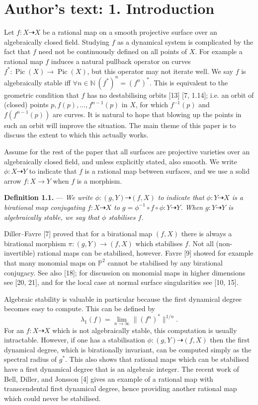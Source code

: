 \documentclass[11pt]{article}
\newcommand{\rat}{\dashrightarrow}
\newcommand{\Pic}{\operatorname{Pic}}
\newcommand{\sourcestatement}[2]{\par\medskip\noindent\textbf{#1.} --- \textit{#2}\par}
\begin{document}
\clearpage
\section*{Author's text: 1. Introduction}
Let $f:X\rat X$ be a rational map on a smooth projective surface over an
algebraically closed field. Studying $f$ as a dynamical system is complicated
by the fact that $f$ need not be continuously defined on all points of $X$.
For example a rational map $f$ induces a natural pullback operator on curves
$f^*:\Pic(X)\to\Pic(X)$, but this operator may not iterate well. We say
$f$ is algebraically stable iff $\forall n\in\mathbb N\ (f^*)^n=(f^n)^*$.
This is equivalent to the geometric condition that $f$ has no destabilising
orbits [13] [7, 1.14]; i.e. an orbit of (closed) points
$p,f(p),\ldots,f^{n-1}(p)$ in $X$, for which $f^{-1}(p)$ and
$f(f^{n-1}(p))$ are curves. It is natural to hope that blowing up the points
in such an orbit will improve the situation. The main theme of this paper
is to discuss the extent to which this actually works.

Assume for the rest of the paper that all surfaces are projective varieties
over an algebraically closed field, and unless explicitly stated, also
smooth. We write $\phi:X\rat Y$ to indicate that $f$ is a rational map
between surfaces, and we use a solid arrow $f:X\to Y$ when $f$ is a morphism.

\sourcestatement{Definition 1.1}{We write $\phi:(g,Y)\rat(f,X)$ to indicate
that $\phi:Y\rat X$ is a birational map conjugating $f:X\rat X$ to
$g=\phi^{-1}\circ f\circ\phi:Y\rat Y$. When $g:Y\rat Y$ is algebraically
stable, we say that $\phi$ stabilises $f$.}

Diller--Favre [7] proved that for a birational map $(f,X)$ there is always
a birational morphism $\pi:(g,Y)\to(f,X)$ which stabilises $f$. Not all
(non-invertible) rational maps can be stabilised, however. Favre [9] showed
for example that many monomial maps on $\mathbb P^2$ cannot be stabilised by
any birational conjugacy. See also [18]; for discussion on monomial maps in
higher dimensions see [20, 21], and for the local case at normal surface
singularities see [10, 15].

Algebraic stability is valuable in particular because the first dynamical
degree becomes easy to compute. This can be defined by
\[
 \lambda_1(f)=\lim_{n\to\infty}\|(f^n)^*\|^{1/n}.
\]
For an $f:X\rat X$ which is not algebraically stable, this computation is
usually intractable. However, if one has a stabilisation
$\phi:(g,Y)\rat(f,X)$ then the first dynamical degree, which is birationally
invariant, can be computed simply as the spectral radius of $g^*$. This
also shows that rational maps which can be stabilised have a first dynamical
degree that is an algebraic integer. The recent work of Bell, Diller, and
Jonsson [4] gives an example of a rational map with transcendental first
dynamical degree, hence providing another rational map which could never
be stabilised.
\end{document}
